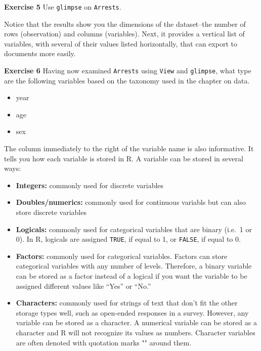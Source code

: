 \documentclass[
]{book}
\providecommand{\tightlist}{%
  \setlength{\itemsep}{0pt}\setlength{\parskip}{0pt}}
\newenvironment{learncheck}%
{%
  \par\vspace{\baselineskip}\noindent 
  \color{Exercise}\begin{itshape}%
  \par\vspace{\baselineskip}\noindent\ignorespaces 
}%
{%
  \end{itshape}\ignorespacesafterend 
}
\begin{document}
\begin{learncheck}
\textbf{Exercise 5} Use \texttt{glimpse} on \texttt{Arrests}.
\end{learncheck}

Notice that the results show you the dimensions of the dataset--the number of rows (observation) and columns (variables). Next, it provides a vertical list of variables, with several of their values listed horizontally, that can export to documents more easily.

\begin{learncheck}
\textbf{Exercise 6} Having now examined \texttt{Arrests} using
\texttt{View} and \texttt{glimpse}, what type are the following
variables based on the taxonomy used in the chapter on data.

\begin{itemize}
\tightlist
\item
  year
\item
  age
\item
  sex
\end{itemize}
\end{learncheck}

The column immediately to the right of the variable name is also informative. It tells you how each variable is stored in R. A variable can be stored in several ways:

\begin{itemize}
\tightlist
\item
  \textbf{Integers:} commonly used for discrete variables
\item
  \textbf{Doubles/numerics:} commonly used for continuous variabls but can also store discrete variables
\item
  \textbf{Logicals:} commonly used for categorical variables that are binary (i.e.~1 or 0). In R, logicals are assigned \texttt{TRUE}, if equal to 1, or \texttt{FALSE}, if equal to 0.
\item
  \textbf{Factors:} commonly used for categorical variables. Factors can store categorical variables with any number of levels. Therefore, a binary variable can be stored as a factor instead of a logical if you want the variable to be assigned different values like ``Yes'' or ``No.''
\item
  \textbf{Characters:} commonly used for strings of text that don't fit the other storage types well, such as open-ended responses in a survey. However, any variable can be stored as a character. A numerical variable can be stored as a character and R will not recognize its values as numbers. Character variables are often denoted with quotation marks "" around them.
\end{itemize}
\end{document}
